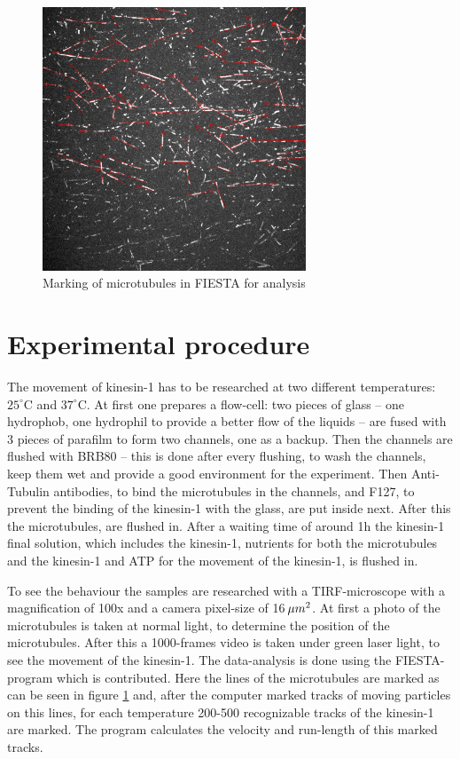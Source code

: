 \documentclass[english, %
parskip=full, %
bibliography=totoc, %
]{scrartcl}
\begin{document}
\begin{figure}[!ht] 
  \centering
     \includegraphics[width=0.7\textwidth]{kinesin_marking}
  \caption{Marking of microtubules in FIESTA for analysis}
  \label{fig:marking}
\end{figure}

\section{Experimental procedure}

The movement of kinesin-1 has to be researched at two different temperatures: $25^\circ\text{C}$ and $37^\circ\text{C}$.
At first one prepares a flow-cell: two pieces of glass – one hydrophob, one hydrophil to provide a better flow of the liquids – are fused with 3 pieces of parafilm to form two channels, one as a backup. Then the channels are flushed with BRB80 – this is done after every flushing, to wash the channels, keep them wet and provide a good environment for the experiment. Then Anti-Tubulin antibodies, to bind the microtubules in the channels, and F127, to prevent the binding of the kinesin-1 with the glass, are put inside next. After this the microtubules, are flushed in. After a waiting time of around 1h the kinesin-1 final solution, which includes the kinesin-1, nutrients for both the microtubules and the kinesin-1 and ATP for the movement of the kinesin-1, is flushed in.

To see the behaviour the samples are researched with a TIRF-microscope with a magnification of 100x and a camera pixel-size of 16\,$\mu m\textsuperscript{2}$. At first a photo of the microtubules is taken at normal light, to determine the position of the microtubules. After this a 1000-frames video is taken under green laser light, to see the movement of the kinesin-1. The data-analysis is done using the FIESTA-program which is contributed. Here the lines of the microtubules are marked as can be seen in figure \ref{fig:marking} and, after the computer marked tracks of moving particles on this lines, for each temperature 200-500 recognizable tracks of the kinesin-1 are marked. The program calculates the velocity and run-length of this marked tracks.
\end{document}
